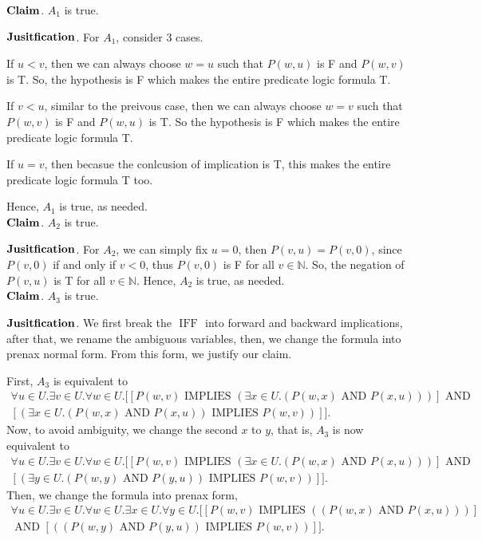 \documentclass[11pt]{article}
\newcommand{\aand}{\,\,\mathrm{AND}\,\,}
\newcommand{\iimplies}{\,\,\mathrm{IMPLIES}\,\,}
\newcommand{\iif}{\,\,\mathrm{IFF}\,\,}
\newcommand{\nats}{\mathbb{N}}
\begin{document}
\begin{enumerate}
\begin{enumerate}
$\bold{Claim}$. $A_1$ is true. 

$\bold{Jusitfication}$. For $A_1$, consider 3 cases. 

If $u < v$,  then we can always choose $w=u$ such that $P(w,u)$ is F and $P(w,v)$ is T. So, the hypothesis is F which makes the entire predicate logic formula T. 

If $v < u$, similar to the preivous case, then we can always choose $w=v$ such that $P(w,v)$ is F and $P(w, u)$ is T. So the hypothesis is F which makes the entire predicate logic formula T.

If $u=v$, then becasue the conlcusion of implication is T, this makes the entire predicate logic formula T too. 

Hence, $A_1$ is true, as needed.\\

$\bold{Claim}$. $A_2$ is true.

$\bold{Jusitfication}$. For $A_2$, we can simply fix $u=0$, then $P(v,u)=P(v,0)$, since $P(v,0)$ if and only if $v<0$, thus $P(v,0)$ is F for all $v\in\nats$. So, the negation of $P(v,u)$ is T for all $v\in\nats$. Hence, $A_2$ is true, as needed.\\

$\bold{Claim}$. $A_3$ is true.

$\bold{Jusitfication}$. We first break the $\iif$ into forward and backward implications, after that, we rename the ambiguous variables, then, we change the formula into prenax normal form. From this form, we justify our claim.

First, $A_3$ is equivalent to \begin{multline*}
    \forall u\in U. \exists v\in U. \forall w\in U. [[P(w,v)\iimplies (\exists x\in U. (P(w,x)\aand P(x,u)))]\aand\\
    [(\exists x\in U. (P(w,x) \aand P(x,u))\iimplies P(w,v))]].
\end{multline*} Now, to avoid ambiguity, we change the second $x$ to $y$, that is, $A_3$ is now equivalent to \begin{multline*}
    \forall u\in U. \exists v\in U. \forall w\in U. [[P(w,v)\iimplies (\exists x\in U. (P(w,x)\aand P(x,u)))]\aand\\
    [(\exists y\in U. (P(w,y) \aand P(y,u))\iimplies P(w,v))]].
\end{multline*} Then, we change the formula into prenax form, \begin{multline*}
    \forall u\in U. \exists v\in U. \forall w\in U. \exists x\in U. \forall y\in U. [[P(w,v)\iimplies ((P(w,x)\aand P(x,u)))]\\\aand [((P(w,y) \aand P(y,u))\iimplies P(w,v))]].
\end{multline*}


\end{enumerate}
\end{enumerate}
\end{document}
